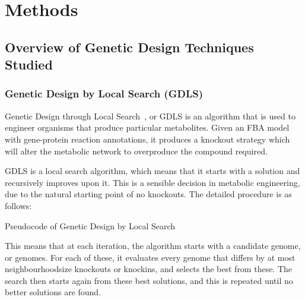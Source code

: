 \chapter{Methods}

\section{Overview of Genetic Design Techniques Studied}

\subsection{Genetic Design by Local Search (GDLS)}
Genetic Design through Local Search~\cite{Lun2009}, or GDLS is an algorithm that is used to engineer organisms that produce particular metabolites. 
Given an FBA model with gene-protein reaction annotations, it produces a knockout strategy which will alter the metabolic network to overproduce the compound required.

GDLS is a local search algorithm, which means that it starts with a solution and recursively improves upon it. 
This is a sensible decision in metabolic engineering, due to the natural starting point of no knockouts. 
The detailed procedure is as follows:

\begin{algorithm}
\caption{Pseudocode of Genetic Design by Local Search}
\label{alg:GDLS}
\begin{algorithmic}
\EndWhile
\end{algorithmic}
\end{algorithm}

This means that at each iteration, the algorithm starts with a candidate genome, or genomes. For each of these, it evaluates every genome that differs by at most neighbourhoodsize knockouts or knockins, and selects the best from these. The search then starts again from these best solutions, and this is repeated until no better solutions are found. 

